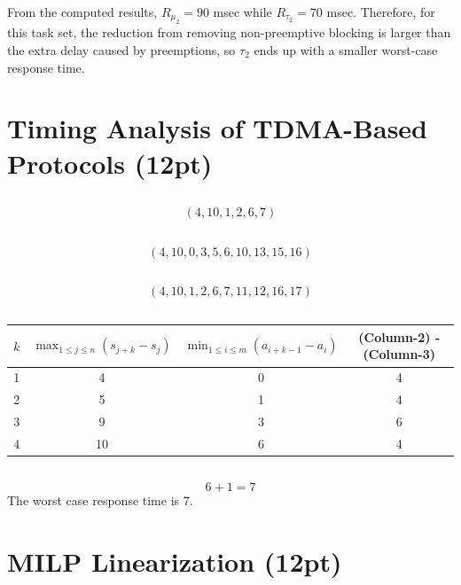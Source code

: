 \documentclass{article}
\begin{document}
From the computed results, $R_{\mu_2}=90$ msec while $R_{\tau_2}=70$ msec. Therefore, for this task set, the reduction from removing non-preemptive blocking is larger than the extra delay caused by preemptions, so $\tau_2$ ends up with a smaller worst-case response time.
\section{Timing Analysis of TDMA-Based Protocols (12pt)}

\subsection{}
$$(4,10,1,2,6,7)$$
\subsection{}
$$(4,10,0,3,5,6,10,13,15,16)$$
\subsection{}
$$(4,10,1,2,6,7,11,12,16,17)$$
\subsection{}
\begin{table}[H]
    \centering
    \renewcommand{\arraystretch}{1.3}
    \begin{tabular}{|c|c|c|c|}
        \hline
        $k$ & $\max_{1\le j\le n}(s_{j+k}-s_j)$ & $\min_{1\le i\le m}(a_{i+k-1}-a_i)$ & (Column-2) - (Column-3) \\
        \hline
        1 & 4 & 0 & 4 \\
        \hline
        2 & 5 & 1 & 4 \\
        \hline
        3 & 9 & 3 & 6 \\
        \hline
        4 & 10 & 6 & 4 \\
        \hline
    \end{tabular}
\end{table}
\subsection{}
\[6+1=7\]
The worst case response time is 7.
\section{MILP Linearization (12pt)}
\subsection{}
\end{document}
